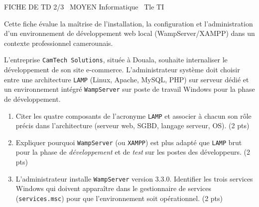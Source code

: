 \documentclass[11pt]{article}
\begin{document}
\begin{tcolorbox}[enhanced,colback=popink,colframe=popink,arc=10pt,boxrule=0pt,left=12pt,right=12pt,top=9pt,bottom=9pt]
{\color{white}\popxbold\small FICHE DE TD 2/3 \textbullet\ MOYEN \hfill Informatique \textbullet\ Tle TI\par}
\end{tcolorbox}
\vspace{4pt}
Cette fiche évalue la maîtrise de l'installation, la configuration et l'administration d'un environnement de développement web local (WampServer/XAMPP) dans un contexte professionnel camerounais.

\begin{exercice}
L'entreprise \texttt{CamTech Solutions}, située à Douala, souhaite internaliser le développement de son site e-commerce. L'administrateur système doit choisir entre une architecture \texttt{LAMP} (Linux, Apache, MySQL, PHP) sur serveur dédié et un environnement intégré \texttt{WampServer} sur poste de travail Windows pour la phase de développement.

\begin{enumerate}
    \item Citer les quatre composants de l'acronyme \texttt{LAMP} et associer à chacun son rôle précis dans l'architecture (serveur web, SGBD, langage serveur, OS). (2 pts)
    \item Expliquer pourquoi \texttt{WampServer} (ou \texttt{XAMPP}) est plus adapté que \texttt{LAMP} brut pour la phase de \textit{développement} et de \textit{test} sur les postes des développeurs. (2 pts)
    \item L'administrateur installe \texttt{WampServer} version 3.3.0. Identifier les trois services Windows qui doivent apparaître dans le gestionnaire de services (\texttt{services.msc}) pour que l'environnement soit opérationnel. (2 pts)
\end{enumerate}
\end{exercice}
\end{document}
